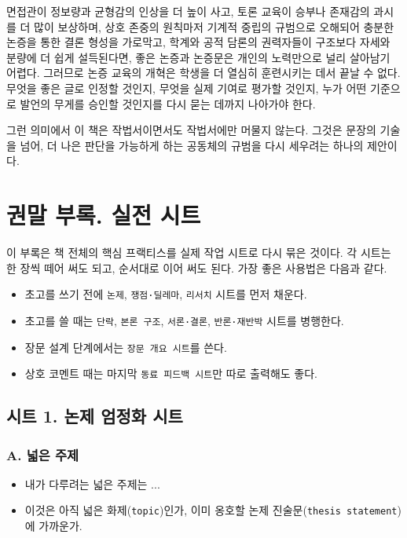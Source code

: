 면접관이 정보량과 균형감의 인상을 더 높이 사고, 토론 교육이 승부나 존재감의 과시를 더 많이 보상하며, 상호 존중의 원칙마저 기계적 중립의 규범으로 오해되어 충분한 논증을 통한 결론 형성을 가로막고, 학계와 공적 담론의 권력자들이 구조보다 자세와 분량에 더 쉽게 설득된다면, 좋은 논증과 논증문은 개인의 노력만으로 널리 살아남기 어렵다. 그러므로 논증 교육의 개혁은 학생을 더 열심히 훈련시키는 데서 끝날 수 없다. 무엇을 좋은 글로 인정할 것인지, 무엇을 실제 기여로 평가할 것인지, 누가 어떤 기준으로 발언의 무게를 승인할 것인지를 다시 묻는 데까지 나아가야 한다.

그런 의미에서 이 책은 작법서이면서도 작법서에만 머물지 않는다. 그것은 문장의 기술을 넘어, 더 나은 판단을 가능하게 하는 공동체의 규범을 다시 세우려는 하나의 제안이다.

\chapter{권말 부록. 실전 시트}\label{uxad8cuxb9d0-uxbd80uxb85d-uxc2e4uxc804-uxc2dcuxd2b8}

이 부록은 책 전체의 핵심 프랙티스를 실제 작업 시트로 다시 묶은 것이다. 각 시트는 한 장씩 떼어 써도 되고, 순서대로 이어 써도 된다. 가장 좋은 사용법은 다음과 같다.

\begin{itemize}
\tightlist
\item
  초고를 쓰기 전에 \texttt{논제}, \texttt{쟁점·딜레마}, \texttt{리서치} 시트를 먼저 채운다.
\item
  초고를 쓸 때는 \texttt{단락}, \texttt{본론\ 구조}, \texttt{서론·결론}, \texttt{반론·재반박} 시트를 병행한다.
\item
  장문 설계 단계에서는 \texttt{장문\ 개요\ 시트}를 쓴다.
\item
  상호 코멘트 때는 마지막 \texttt{동료\ 피드백\ 시트}만 따로 출력해도 좋다.
\end{itemize}

\section{시트 1. 논제 엄정화 시트}\label{uxc2dcuxd2b8-1-uxb17cuxc81c-uxc5c4uxc815uxd654-uxc2dcuxd2b8}

\subsection{A. 넓은 주제}\label{a-uxb113uxc740-uxc8fcuxc81c}

\begin{itemize}
\tightlist
\item
  내가 다루려는 넓은 주제는 ...
\item
  이것은 아직 넓은 화제(\texttt{topic})인가, 이미 옹호할 논제 진술문(\texttt{thesis\ statement})에 가까운가.
\end{itemize}

